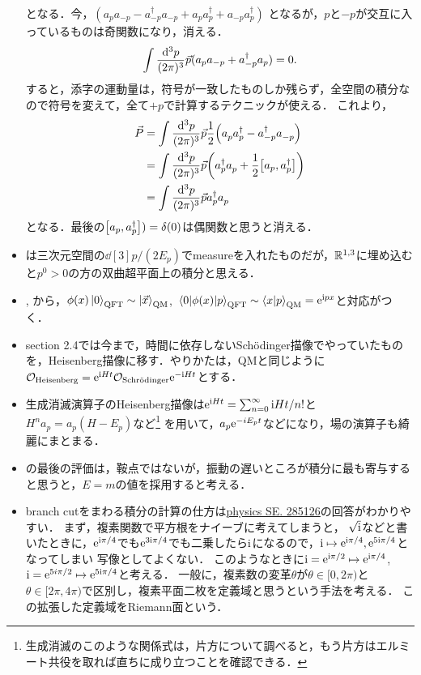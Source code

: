 \begin{itemize}
		となる．今，$(a_pa_{-p}-a_{-p}^\dag a_{-p}+a_pa_p^{\dag}+a_{-p}a_{p}^\dag)$
		となるが，$p$と$-p$が交互に入っているものは奇関数になり，消える．		\begin{equation}
			\int \frac{\dd[3]{p}}{(2\pi)^{3}}\vec{p}(a_pa_{-p}+a_{-p}^{\dag}a_{p}) = 0.
		\end{equation}
		すると，添字の運動量は，符号が一致したものしか残らず，全空間の積分なので符号を変えて，全て$+p$で計算するテクニックが使える．
		これより，
		\begin{align}
			\vec{P} &= \int \frac{\dd[3]{p}}{(2\pi)^{3}}\vec{p}\frac{1}{2}\qty(a_p^{}a_p^{\dag}-a_{-p}^\dag a_{-p}^{})\\
					&= \int \frac{\dd[3]{p}}{(2\pi)^{3}}\vec{p}\qty(a_p^{\dag}a_{p}^{}+\frac{1}{2}\qty[a_{p}{}, a_{p}^{\dag}])\\
					&= \int \frac{\dd[3]{p}}{(2\pi)^{3}}\vec{p}a_p^\dag a_p^{}
		\end{align}
		となる．最後の$\qty[a_{p}{}, a_{p}^{\dag}])= \delta(0)$は偶関数と思うと消える．
	\item {}は三次元空間の$\dd[3]p/(2E_p)$でmeasureを入れたものだが，$\mathbb{R}^{1,3}$に埋め込むと$p^0>0$の方の双曲超平面上の積分と思える．
	\item {}, から，$\phi(x)\ket{0}_{\text{QFT}}\sim\ket{\vec{x}}_{\text{QM}}$, $\mel{0}{\phi(x)}{p}_{\text{QFT}}\sim\braket{x}{p}_{\text{QM}}=\mathrm{e}^{\mathrm{i} px}$と対応がつく．
	\item section 2.4では今まで，時間に依存しないSch\"{o}dinger描像でやっていたものを，Heisenberg描像に移す．やりかたは，QMと同じように$\mathcal{O}_{\text{Heisenberg}} = \mathrm{e}^{\mathrm{i} Ht}\mathcal{O}_{\text{Schr\"{o}dinger}}\mathrm{e}^{-\mathrm{i} Ht}$とする．
	\item 生成消滅演算子のHeisenberg描像は$\mathrm{e}^{\mathrm{i} Ht} = \sum_{n=0}^{\infty}\mathrm{i} Ht/n!$と$H^na_p=a_p(H-E_p)$など\footnote{生成消滅のこのような関係式は，片方について調べると，もう片方はエルミート共役を取れば直ちに成り立つことを確認できる．}
		を用いて，$a_p\mathrm{e}^{-iE_pt}$などになり，場の演算子も綺麗にまとまる．
	\item {}の最後の評価は，鞍点ではないが，振動の遅いところが積分に最も寄与すると思うと，$E=m$の値を採用すると考える．
	\item branch cutをまわる積分の計算の仕方は\href{https://physics.stackexchange.com/questions/285126/an-integral-in-peskins-quantum-field-theory-p-27}{physics SE. 285126}の回答がわかりやすい．
		まず，複素関数で平方根をナイーブに考えてしまうと，
		$\sqrt{\mathrm{i}}$などと書いたときに，$\mathrm{e}^{\mathrm{i}\pi/4}$でも$\mathrm{e}^{3\mathrm{i}\pi/4}$でも二乗したら$\mathrm{i}$になるので，$\mathrm{i}\mapsto\mathrm{e}^{\mathrm{i}\pi/4}, \mathrm{e}^{5\mathrm{i}\pi/4}$となってしまい
		写像としてよくない．
		このようなときに$\mathrm{i}=\mathrm{e}^{\mathrm{i}\pi/2}\mapsto\mathrm{e}^{\mathrm{i}\pi/4}$, $\mathrm{i}=\mathrm{e}^{5i\pi/2}\mapsto \mathrm{e}^{5\mathrm{i}\pi/4}$と考える．
		一般に，複素数の変革$\theta$が$\theta\in[0, 2\pi)$と$\theta\in[2\pi, 4\pi)$で区別し，複素平面二枚を定義域と思うという手法を考える．
		この拡張した定義域をRiemann面という．


\end{itemize}
